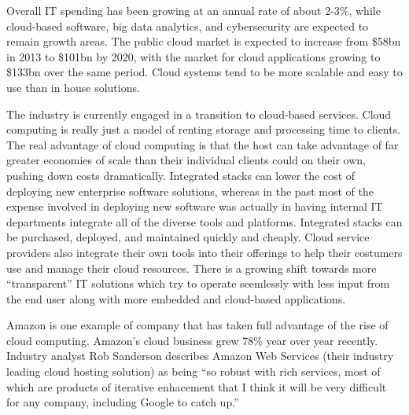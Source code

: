 Overall IT spending has been growing at an annual rate of about 2-3\%, while cloud-based software, big data analytics, and cybersecurity are expected to remain growth areas.\autocite[]{CloudAnalyticsCybersecurityApplication}\hspace{5mm}\autocite[]{CIOIntro}
The public cloud market is expected to increase from \$58bn in 2013 to \$101bn by 2020, with the market for cloud applications growing to \$133bn over the same period.\autocite[]{CIOIntro}
Cloud systems tend to be more scalable and easy to use than in house solutions.\autocite[]{CIOIntro}

The industry is currently engaged in a transition to cloud-based services.\autocite[39]{SurveysSoftware2015}
Cloud computing is really just a model of renting storage and processing time to clients.\autocite[]{AftermathOfIntegratedStack}
The real advantage of cloud computing is that the host can take advantage of far greater economies of scale than their individual clients could on their own, pushing down costs dramatically.\autocite[]{AftermathOfIntegratedStack}
Integrated stacks can lower the cost of deploying new enterprise software solutions, whereas in the past most of the expense involved in deploying new software was actually in having internal IT departments integrate all of the diverse tools and platforms.
Integrated stacks can be purchased, deployed, and maintained quickly and cheaply.\autocite[]{AftermathOfIntegratedStack}
Cloud service providers also integrate their own tools into their offerings to help their costumers use and manage their cloud resources.\autocite[]{AftermathOfIntegratedStack}
There is a growing shift towards more ``transparent'' IT solutions which try to operate seemlessly with less input from the end user along with more embedded and cloud-based applications.\autocite[]{OptimismInnovation}

Amazon is one example of company that has taken full advantage of the rise of cloud computing.
Amazon's cloud business grew 78\% year over year recently.\autocite[]{GoogleCloudBoost}
Industry analyst Rob Sanderson describes Amazon Web Services (their industry leading cloud hosting solution) as being ``so robust with rich services, most of which are products of iterative enhacement that I think it will be very difficult for any company, including Google to catch up.''\autocite[]{GoogleCloudBoost}

